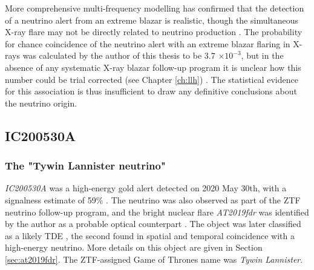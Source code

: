 More comprehensive multi-frequency modelling has confirmed that the detection of a neutrino alert from an extreme blazar is realistic, though the simultaneous X-ray flare may not be directly related to neutrino production . The probability for chance coincidence of the neutrino alert with an extreme blazar flaring in X-rays was calculated by the author of this thesis to be 3.7 $\times 10^{-3}$, but in the absence of any systematic X-ray blazar follow-up program it is unclear how this number could be trial corrected (see Chapter \ref{ch:llh}) \cite{paliya_20}. The statistical evidence for this association is thus insufficient to draw any definitive conclusions about the neutrino origin.

\subsection{IC200530A}
\subsubsection{The "Tywin Lannister neutrino"}

\emph{IC200530A} was a high-energy gold alert detected on 2020 May 30th, with a signalness estimate of 59\% . The neutrino was also observed as part of the ZTF neutrino follow-up program, and the bright nuclear flare \emph{AT2019fdr} was identified by the author as a probable optical counterpart . The object was later classified as a likely TDE , the second found in spatial and temporal coincidence with a high-energy neutrino. More details on this object are given in Section \ref{sec:at2019fdr}. The ZTF-assigned Game of Thrones name was \emph{Tywin Lannister}.